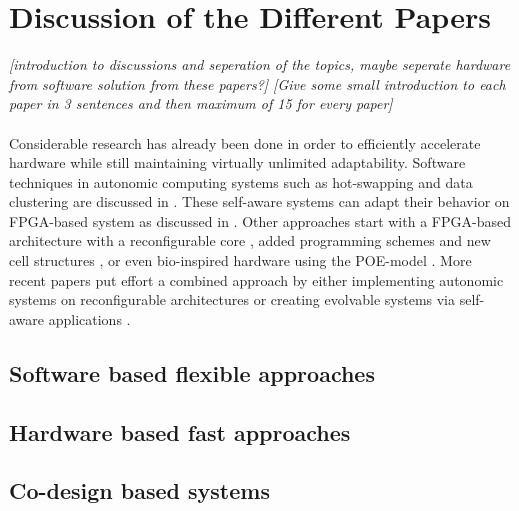 
\section{Discussion of the Different Papers}
\label{sec:discussion}

\emph{[introduction to discussions and seperation of the topics, maybe seperate hardware from software solution from these papers?]
[Give some small introduction to each paper in 3 sentences and then maximum of 15 for every paper]}
\\
\\
Considerable research has already been done in order to efficiently accelerate hardware while still maintaining virtually unlimited adaptability. 
Software techniques in autonomic computing systems such as hot-swapping and data clustering are discussed in \cite{survey}. 
These self-aware systems can adapt their behavior on FPGA-based system as discussed in \cite{selfaware}.
Other approaches start with a FPGA-based architecture with a reconfigurable core \cite{drp},  added programming schemes and new cell structures \cite{virtex4}, \cite{erlangen} or even bio-inspired hardware using the POE-model \cite{poe}.
More recent papers put effort a combined approach by either implementing autonomic systems on reconfigurable architectures \cite{reconfigurable} or creating evolvable systems via self-aware applications \cite{evolvable}.

\subsection{Software based flexible approaches}
\label{sec:software}



\subsection{Hardware based fast approaches}
\label{sec:hardware}


\subsection{Co-design based systems}
\label{sec:codesign}



